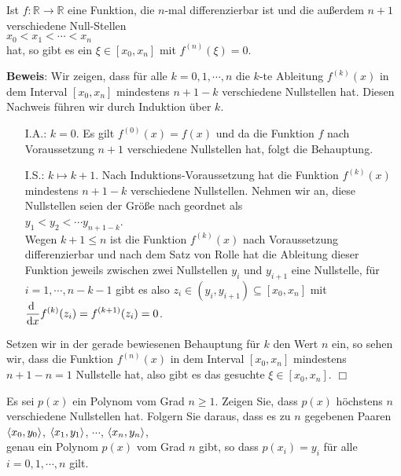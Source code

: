 \begin{Satz}
  Ist $f:\mathbb{R} \rightarrow \mathbb{R}$ eine Funktion, die $n$-mal differenzierbar
  ist und die au{\ss}erdem $n+1$ verschiedene Null-Stellen 
  \\[0.2cm]
  \hspace*{1.3cm}  $x_0 < x_1 < \cdots < x_n$
  \\[0.2cm]
  hat, so gibt es ein $\xi\in[x_0,x_n]$ mit $f^{(n)}(\xi) = 0$.
\end{Satz}
\textbf{Beweis}:  Wir zeigen, dass f\"ur alle $k=0,1,\cdots,n$ die $k$-te Ableitung
$f^{(k)}(x)$ in dem Interval $[x_0,x_n]$ mindestens $n+1-k$ verschiedene Nullstellen hat.
Diesen Nachweis f\"uhren wir durch Induktion \"uber $k$.
\begin{enumerate}
\item[I.A.:] $k=0$. Es gilt $f^{(0)}(x) = f(x)$ und da die Funktion $f$ nach Voraussetzung $n+1$
             verschiedene Nullstellen hat, folgt die Behauptung.
\item[I.S.:] $k\mapsto k+1$.  Nach Induktions-Voraussetzung hat die Funktion
             $f^{(k)}(x)$ mindestens $n + 1 -k$ verschiedene Nullstellen.
             Nehmen wir an, diese Nullstellen seien der Gr\"o{\ss}e nach geordnet als
             \\[0.2cm]
             \hspace*{1.3cm} $y_1 < y_2 < \cdots y_{n+1-k}$. \\[0.2cm]
             Wegen $k+1\leq n$ ist die Funktion $f^{(k)}(x)$ nach Voraussetzung
             differenzierbar und nach dem Satz von Rolle hat die Ableitung dieser Funktion
             jeweils zwischen zwei Nullstellen $y_i$ und $y_{i+1}$ eine Nullstelle, 
             f\"ur $i=1,\cdots,n-k-1$ gibt es also $z_i \in (y_i,y_{i+1}) \subseteq[x_0,x_n]$ mit 
             \\[0.2cm]
             \hspace*{1.3cm} $\displaystyle\frac{\textrm{d}\;}{\textrm{d}x} f^{(k)}(z_i) = f^{(k+1)}(z_i) = 0$.
\end{enumerate}
Setzen wir in der gerade bewiesenen Behauptung f\"ur $k$ den Wert $n$ ein, so sehen wir, dass die Funktion $f^{(n)}(x)$ in dem Interval
$[x_0,x_n]$ mindestens $n+1-n=1$ Nullstelle hat, also gibt es das gesuchte
$\xi\in[x_0,x_n]$.
\hspace*{\fill} $\Box$

\exercise
Es sei $p(x)$  ein Polynom vom Grad $n\geq 1$.  Zeigen Sie, dass
$p(x)$ h\"ochstens $n$ verschiedene Nullstellen hat.  Folgern Sie daraus, dass es zu $n$ gegebenen Paaren 
\\[0.2cm]
\hspace*{1.3cm}
$\pair(x_0,y_0)$, $\pair(x_1,y_1)$, $\cdots$, $\pair(x_n,y_n)$,
\\[0.2cm]
genau ein Polynom $p(x)$ vom Grad $n$ gibt, so dass $p(x_i) = y_i$ f\"ur alle $i=0,1,\cdots,n$ gilt. \eox


